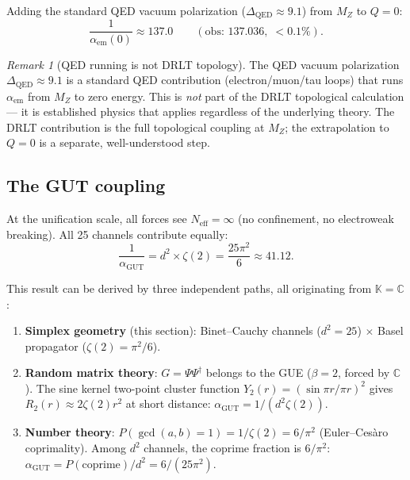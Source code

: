 \documentclass[12pt]{article}
\theoremstyle{remark}
\newtheorem{remark}[theorem]{Remark}
\theoremstyle{definition}
\newcommand{\CC}{\mathbb{C}}
\begin{document}
Adding the standard QED vacuum polarization ($\Delta_\text{QED} \approx 9.1$) from $M_Z$ to $Q = 0$:
\begin{equation}
\frac{1}{\alpha_\text{em}(0)} \approx 137.0 \qquad (\text{obs: } 137.036,\; <0.1\%).
\end{equation}

\begin{remark}[QED running is not DRLT topology]
The QED vacuum polarization $\Delta_\text{QED} \approx 9.1$ is a standard QED contribution (electron/muon/tau loops) that runs $\alpha_\text{em}$ from $M_Z$ to zero energy. This is \emph{not} part of the DRLT topological calculation --- it is established physics that applies regardless of the underlying theory. The DRLT contribution is the full topological coupling at $M_Z$; the extrapolation to $Q = 0$ is a separate, well-understood step.
\end{remark}

\subsection{The GUT coupling}

At the unification scale, all forces see $N_\text{eff} = \infty$ (no confinement, no electroweak breaking). All 25 channels contribute equally:
\begin{equation}
\boxed{\frac{1}{\alpha_\text{GUT}} = d^2 \times \zeta(2) = \frac{25\pi^2}{6} \approx 41.12.}
\end{equation}

This result can be derived by three independent paths, all originating from $\mathbb{K} = \CC$:

\begin{enumerate}
\item \textbf{Simplex geometry} (this section): Binet--Cauchy channels ($d^2 = 25$) $\times$ Basel propagator ($\zeta(2) = \pi^2/6$).

\item \textbf{Random matrix theory}: $G = \Psi\Psi^\dagger$ belongs to the GUE ($\beta = 2$, forced by $\CC$). The sine kernel two-point cluster function $Y_2(r) = (\sin\pi r/\pi r)^2$ gives $R_2(r) \approx 2\zeta(2)r^2$ at short distance: $\alpha_\text{GUT} = 1/(d^2 \zeta(2))$.

\item \textbf{Number theory}: $P(\gcd(a,b) = 1) = 1/\zeta(2) = 6/\pi^2$ (Euler--Ces\`aro coprimality). Among $d^2$ channels, the coprime fraction is $6/\pi^2$: $\alpha_\text{GUT} = P(\text{coprime})/d^2 = 6/(25\pi^2)$.
\end{enumerate}
\end{document}
